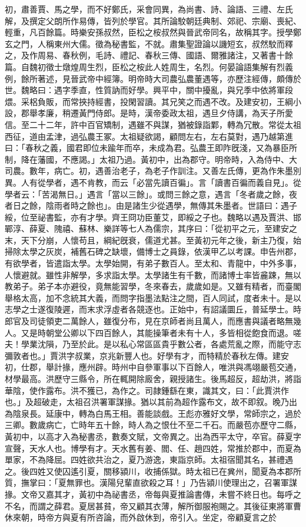 \begin{pinyinscope}
初，肅善賈、馬之學，而不好鄭氏，采會同異，為尚書、詩、論語、三禮、左氏解，及撰定父朗所作易傳，皆列於學官。其所論駮朝廷典制、郊祀、宗廟、喪紀、輕重，凡百餘篇。時樂安孫叔然，臣松之桉叔然與晉武帝同名，故稱其字。授學鄭玄之門，人稱東州大儒。徵為秘書監，不就。肅集聖證論以譏短玄，叔然駮而釋之，及作周易、春秋例，毛詩、禮記、春秋三傳、國語、爾雅諸注，又著書十餘篇。自魏初徵士燉煌周生烈，臣松之桉此人姓周生，名烈。何晏論語集解有烈義例，餘所著述，見晉武帝中經簿。明帝時大司農弘農董遇等，亦歷注經傳，頗傳於世。魏略曰：遇字季直，性質訥而好學。興平中，關中擾亂，與兄季中依將軍段煨。采梠負販，而常挾持經書，投閑習讀。其兄笑之而遇不改。及建安初，王綱小設，郡舉孝廉，稍遷黃門侍郎。是時，漢帝委政太祖，遇旦夕侍講，為天子所愛信。至二十二年，許中百官矯制，遇雖不與謀，猶被錄詣鄴，轉為冗散。常從太祖西征，道由孟津，過弘農王冢。太祖疑欲謁，顧問左右，左右莫對，遇乃越第進曰：「春秋之義，國君即位未踰年而卒，未成為君。弘農王即阼旣淺，又為暴臣所制，降在藩國，不應謁。」太祖乃過。黃初中，出為郡守。明帝時，入為侍中、大司農。數年，病亡。初，遇善治老子，為老子作訓注。又善左氏傳，更為作朱墨別異。人有從學者，遇不肯教，而云「必當先讀百徧」。言「讀書百徧而義自見」。從學者云：「苦渴無日。」遇言「當以三餘」。或問三餘之意，遇言「冬者歲之餘，夜者日之餘，陰雨者時之餘也」。由是諸生少從遇學，無傳其朱墨者。世語曰：遇子綏，位至祕書監，亦有才學。齊王冏功臣董艾，即綏之子也。魏略以遇及賈洪、邯鄲淳、薛夏、隗禧、蘇林、樂詳等七人為儒宗，其序曰：「從初平之元，至建安之末，天下分崩，人懷苟且，綱紀旣衰，儒道尤甚。至黃初元年之後，新主乃復，始掃除太學之灰炭，補舊石碑之缺壞，備博士之員錄，依漢甲乙以考課。申告州郡，有欲學者，皆遣詣太學。太學始開，有弟子數百人。至太和、青龍中，中外多事，人懷避就。雖性非解學，多求詣太學。太學諸生有千數，而諸博士率皆麄踈，無以教弟子。弟子本亦避役，竟無能習學，冬來春去，歲歲如是。又雖有精者，而臺閣舉格太高，加不念統其大義，而問字指墨法點注之間，百人同試，度者未十。是以志學之士遂復陵遲，而末求浮虛者各競逐也。正始中，有詔議圜丘，普延學士。時郎官及司徒領吏二萬餘人，雖復分布，見在京師者尚且萬人，而應書與議者略無幾人。又是時朝堂公卿以下四百餘人，其能操筆者未有十人，多皆相從飽食而退。嗟夫！學業沈隕，乃至於此。是以私心常區區貴乎數公者，各處荒亂之際，而能守志彌敦者也。」賈洪字叔業，京兆新豐人也。好學有才，而特精於春秋左傳。建安初，仕郡，舉計掾，應州辟。時州中自參軍事以下百餘人，唯洪與馮翊嚴苞交通，材學最高。洪歷守三縣令，所在輒開除廄舍，親授諸生。後馬超反，超劫洪，將詣華陰，使作露布。洪不獲已，為作之。司隷鍾繇在東，識其文，曰：「此賈洪作也。」及超破走，太祖召洪署軍謀掾。猶以其前為超作露布文，故不即叙。晚乃出為陰泉長。延康中，轉為白馬王相。善能談戲。王彪亦雅好文學，常師宗之，過於三卿。數歲病亡，亡時年五十餘，時人為之恨仕不至二千石。而嚴苞亦歷守二縣，黃初中，以高才入為秘書丞，數奏文賦，文帝異之。出為西平太守，卒官。薛夏字宣聲，天水人也。博學有才。天水舊有姜、閻、任、趙四姓，常推於郡中，而夏為單家，不為降屈。四姓欲共治之，夏乃游逸，東詣京師。太祖宿聞其名，甚禮遇之。後四姓又使囚遙引夏，關移潁川，收捕係獄。時太祖已在兾州，聞夏為本郡所質，撫掌曰：「夏無罪也。漢陽兒輩直欲殺之耳！」乃告潁川使理出之，召署軍謀掾。文帝又嘉其才，黃初中為祕書丞，帝每與夏推論書傳，未嘗不終日也。每呼之不名，而謂之薛君。夏居甚貧，帝又顧其衣薄，解所御服袍賜之。其後征東將軍曹休來朝，時帝方與夏有所咨論，而外啟休到，帝引入。坐定，帝顧夏言之於
\end{pinyinscope}
